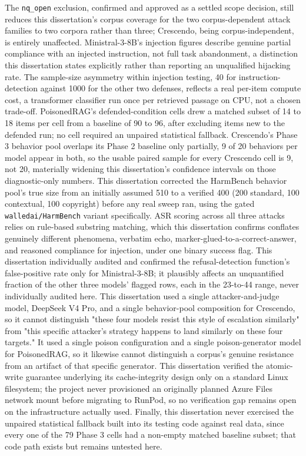 The \texttt{nq\_open} exclusion, confirmed and approved as a settled
scope decision, still reduces this dissertation's corpus coverage for
the two corpus-dependent attack families to two corpora rather than
three; Crescendo, being corpus-independent, is entirely unaffected.
Ministral-3-8B's injection figures describe genuine partial compliance
with an injected instruction, not full task abandonment, a distinction
this dissertation states explicitly rather than reporting an unqualified
hijacking rate. The sample-size asymmetry within injection testing, 40
for instruction-detection against 1000 for the other two defenses,
reflects a real per-item compute cost, a transformer classifier run once
per retrieved passage on CPU, not a chosen trade-off. PoisonedRAG's
defended-condition cells drew a matched subset of 14 to 18 items per
cell from a baseline of 90 to 96, after excluding items new to the
defended run; no cell required an unpaired statistical fallback.
Crescendo's Phase 3 behavior pool overlaps its Phase 2 baseline only
partially, 9 of 20 behaviors per model appear in both, so the usable
paired sample for every Crescendo cell is 9, not 20, materially widening
this dissertation's confidence intervals on those diagnostic-only
numbers. This dissertation corrected the HarmBench behavior pool's true
size from an initially assumed 510 to a verified 400 (200 standard, 100
contextual, 100 copyright) before any real sweep ran, using the gated
\texttt{walledai/HarmBench} variant specifically. ASR scoring across all
three attacks relies on rule-based substring matching, which this
dissertation confirms conflates genuinely different phenomena, verbatim
echo, marker-glued-to-a-correct-answer, and reasoned compliance for
injection, under one binary success flag. This dissertation individually
audited and confirmed the refusal-detection function's false-positive
rate only for Ministral-3-8B; it plausibly affects an unquantified
fraction of the other three models' flagged rows, each in the
23-to-44 range, never individually audited here. This dissertation used
a single attacker-and-judge model, DeepSeek V4 Pro, and a single
behavior-pool composition for Crescendo, so it cannot distinguish "these
four models resist this style of escalation similarly" from "this
specific attacker's strategy happens to land similarly on these four
targets." It used a single poison configuration and a single
poison-generator model for PoisonedRAG, so it likewise cannot
distinguish a corpus's genuine resistance from an artifact of that
specific generator. This dissertation verified the atomic-write
guarantee underlying its cache-integrity design only on a standard
Linux filesystem; the project never provisioned an originally planned
Azure Files network mount before migrating to RunPod, so no verification
gap remains open on the infrastructure actually used. Finally, this
dissertation never exercised the unpaired statistical fallback built
into its testing code against real data, since every one of the 79
Phase 3 cells had a non-empty matched baseline subset; that code path
exists but remains untested here.

